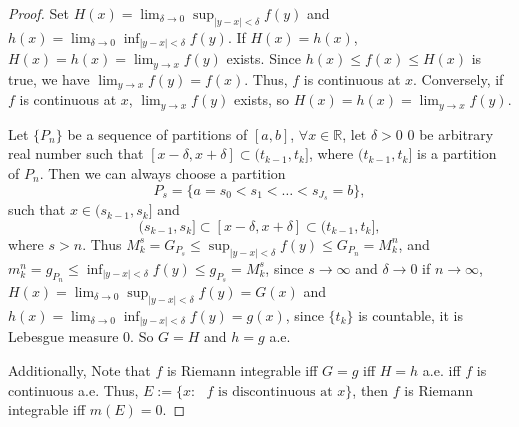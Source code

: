 \begin{proof}
    Set $H(x)=\lim_{\delta\rightarrow0}\sup_{|y-x|<\delta}f(y)$ and
    $h(x)=\lim_{\delta\rightarrow0}\inf_{|y-x|<\delta}f(y)$.
    If $H(x)=h(x)$, $H(x)=h(x)=\lim_{y\rightarrow x}f(y)$ exists.
    Since $h(x)\leq f(x)\leq H(x)$ is true, we have 
    $\lim_{y\rightarrow x}f(y)=f(x)$. Thus, $f$ is continuous at $x$.
    Conversely, if $f$ is continuous at $x$, 
    $\lim_{y\rightarrow x}f(y)$ exists, so $H(x)=h(x)=\lim_{y\rightarrow x}f(y)$.
    
    Let $\{P_n\}$ be a sequence of partitions 
    of $[a, b]$, $\forall x\in\mathbb{R}$,
    let $\delta>0$ 0 be arbitrary real number such that 
    $[x-\delta,x+\delta]\subset(t_{k-1},t_k]$, where $(t_{k-1},t_k]$
    is a partition of $P_n$. Then we can always choose a partition
    \begin{displaymath}
        P_s=\{a=s_0<s_1<\ldots<s_{J_s}=b\},
    \end{displaymath}
    such that $x\in(s_{k-1},s_k]$ and
    \begin{displaymath}
        (s_{k-1},s_k]\subset[x-\delta,x+\delta]\subset(t_{k-1},t_k],
    \end{displaymath}
    where $s>n$. Thus $M_k^s=G_{P_s}\leq\sup_{|y-x|<\delta}f(y)\leq
    G_{P_n}=M_k^n$, and $m_k^n=g_{P_n}\leq\inf_{|y-x|<\delta}f(y)\leq
    g_{P_s}=M_k^s$, since $s\rightarrow\infty$ and $\delta\rightarrow0$ 
    if $n\rightarrow\infty$,  $H(x)=\lim_{\delta\rightarrow0}
    \sup_{|y-x|<\delta}f(y)=G(x)$ and $h(x)=\lim_{\delta\rightarrow0}
    \inf_{|y-x|<\delta}f(y)=g(x)$, since $\{t_k\}$ is countable, 
    it is Lebesgue measure 0. So $G=H$ and $h=g$ a.e.

    Additionally, Note that $f$ is Riemann integrable iff $G = g$ 
    iff $H = h$ a.e. iff $f$ is continuous a.e. Thus, 
    $E:=\{x:\text{ }f\text{ is discontinuous at }x\}$,
    then $f$ is Riemann integrable iff $m(E)=0$.  
\end{proof}
